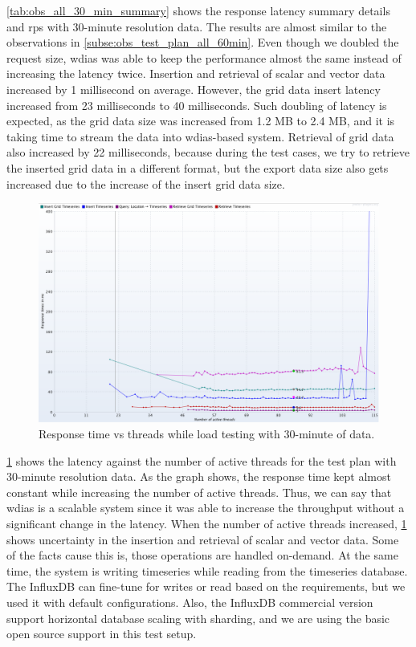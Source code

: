 \cref{tab:obs_all_30_min_summary} shows the response latency summary details and \acrshort{rps} with 30-minute resolution data. The results are almost similar to the observations in \cref{subse:obs_test_plan_all_60min}. Even though we doubled the request size, \acrshort{wdias} was able to keep the performance almost the same instead of increasing the latency twice.
Insertion and retrieval of scalar and vector data increased by 1 millisecond on average. However, the grid data insert latency increased from 23 milliseconds to 40 milliseconds. Such doubling of latency is expected, as the grid data size was increased from 1.2 MB to 2.4 MB, and it is taking time to stream the data into \acrshort{wdias}-based system. Retrieval of grid data also increased by 22 milliseconds, because during the test cases, we try to retrieve the inserted grid data in a different format, but the export data size also gets increased due to the increase of the insert grid data size.

\begin{figure}[htp]
    \centering
    \includegraphics[width=1.0\textwidth]{results/obs/all/obs_all_30m_response_times_vs_threads.png}
    \caption{Response time vs threads while load testing with 30-minute of data.}
    \label{fi:test_obs_all_30m_response_vs_threads}
\end{figure}

\cref{fi:test_obs_all_30m_response_vs_threads} shows the latency against the number of active threads for the test plan with 30-minute resolution data. As the graph shows, the response time kept almost constant while increasing the number of active threads. Thus, we can say that \acrshort{wdias} is a scalable system since it was able to increase the throughput without a significant change in the latency. When the number of active threads increased, \cref{fi:test_obs_all_30m_response_vs_threads} shows uncertainty in the insertion and retrieval of scalar and vector data. Some of the facts cause this is, those operations are handled on-demand. At the same time, the system is writing timeseries while reading from the timeseries database. The InfluxDB can fine-tune for writes or read based on the requirements, but we used it with default configurations. Also, the InfluxDB commercial version support horizontal database scaling with sharding, and we are using the basic open source support in this test setup.

